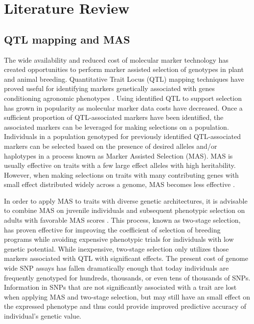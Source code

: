 \section{Literature Review} \label{sec:lit-review}

\subsection*{QTL mapping and MAS}

The wide availability and reduced cost of molecular marker technology
has created opportunities to perform marker assisted selection of genotypes
in plant and animal breeding. Quantitative Trait Locus (QTL) mapping techniques
have proved useful for identifying markers genetically associated with genes 
conditioning agronomic phenotypes \citep{miles2008}. Using identified QTL to
support selection has grown in popularity as molecular marker data costs have 
decreased. Once a sufficient proportion of QTL-associated markers have been identified, 
the associated markers can be leveraged for making selections on a population. 
Individuals in a population genotyped for previously identified QTL-associated
markers can be selected based on the presence of desired alleles 
and/or haplotypes in a process known as Marker Assisted Selection (MAS).
MAS is usually effective on traits with a few large effect alleles with high 
heritability. However, when making selections on traits with many contributing genes
with small effect distributed widely across a genome, MAS becomes less 
effective \citep{heffner2009}.

In order to apply MAS to traits with diverse genetic architectures, it is
advisable to combine MAS on juvenile individuals and subsequent phenotypic
selection on adults with favorable MAS scores \citep{lande1990}. This process, 
known as two-stage selection, has proven effective for improving
the coefficient of selection of breeding programs while avoiding expensive phenotypic
trials for individuals with low genetic potential. While inexpensive, two-stage selection 
only utilizes those markers associated with QTL with significant effects. The present cost of
genome wide SNP assays has fallen dramatically enough that today individuals are
frequently genotyped for hundreds, thousands, or even tens of thousands of SNPs. 
Information in SNPs that are not significantly associated with a trait are lost 
when applying MAS and two-stage selection, but may still have an small effect on the
expressed phenotype and thus could provide improved predictive 
accuracy of individual's genetic value.

